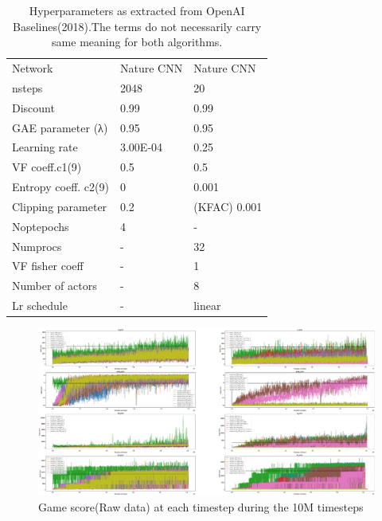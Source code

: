 \begin{table}[]
	\begin{tabular}{l|ll}
		\hline
		\thead{Hyperparameters} & \thead{PPO2} & \thead{ACKTR} \\
		\hline
		Network & Nature CNN & Nature CNN \\
		nsteps & 2048 & 20 \\
		Discount & 0.99 & 0.99 \\
		GAE parameter (λ) & 0.95 & 0.95 \\
		Learning rate & 3.00E-04 & 0.25 \\
		VF coeff.c1(9) & 0.5 & 0.5 \\
		Entropy coeff. c2(9) & 0 & 0.001 \\
		Clipping parameter & 0.2 & (KFAC) 0.001 \\
		Noptepochs & 4 & - \\
		Numprocs & - & 32 \\
		VF fisher coeff & - & 1 \\
		Number of actors & - & 8 \\
		Lr schedule & - & linear \\
		\hline
	\end{tabular}
\caption{Hyperparameters as extracted from OpenAI Baselines(2018).The terms do not necessarily carry same meaning for both algorithms.}
\end{table}

\begin{figure}[b]
	\includegraphics[width=\textwidth]{fig13.png} 
	\caption{Game score(Raw data) at each timestep during the 10M timesteps }
\end{figure}

